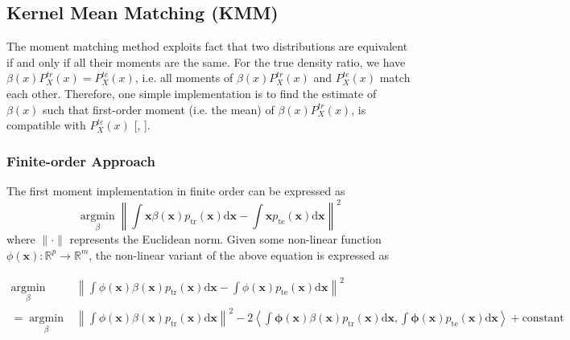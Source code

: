 \documentclass[a4paper,12pt]{article}
\begin{document}
%
%
%
%
%
%
\subsection{Kernel Mean Matching (KMM)}
The moment matching method exploits fact that two distributions are equivalent if and only if all their moments are the same. For the true density ratio, we have $\beta(x){P^{tr}_{X}(x)} =  P^{te}_{X}(x)$, i.e. all moments of $\beta(x){P^{tr}_{X}(x)}$ and $P^{te}_{X}(x)$ match each other. Therefore, one simple implementation is to find the estimate of $\beta(x)$ such that first-order moment (i.e. the mean) of $\beta(x)P^{tr}_{X}(x)$, is compatible with $P^{te}_{X}(x)$ [\cite{gretton2009covariate}, \cite{sugiyama2010density}].

\subsubsection{Finite-order Approach}
The first moment implementation in finite order can be expressed as 
\begin{equation*}
\underset{\beta}{\operatorname{argmin}}\left\|\int \boldsymbol{x} \beta(\boldsymbol{x}) p_{\mathrm{tr}}(\boldsymbol{x}) \mathrm{d} \boldsymbol{x}-\int \boldsymbol{x} p_{\mathrm{te}}(\boldsymbol{x}) \mathrm{d} \boldsymbol{x}\right\|^{2}
\end{equation*}
where $\|\cdot\|$ represents the Euclidean norm. Given some non-linear function $\phi(\boldsymbol{x}): \mathbb{R}^{p} \rightarrow \mathbb{R}^{m}$, the non-linear variant of the above equation is expressed as 

\begin{align*}
\underset{\beta}{\operatorname{argmin}} & \left\|\int \phi{(\boldsymbol{x})} \beta(\boldsymbol{x}) p_{\mathrm{tr}}(\boldsymbol{x}) \mathrm{d} \boldsymbol{x}-\int \phi{(\boldsymbol{x})} p_{\mathrm{te}}(\boldsymbol{x}) \mathrm{d} \boldsymbol{x}\right\|^{2} \\
= \underset{\beta}{\operatorname{argmin}} & \left\|\int \phi(\boldsymbol{x}) \beta(\boldsymbol{x}) p_{\mathrm{tr}}(\boldsymbol{x}) \mathrm{d} \boldsymbol{x}\right\|^{2}-2\left\langle\int \boldsymbol{\phi}(\boldsymbol{x}) \beta(\boldsymbol{x}) p_{\mathrm{tr}}(\boldsymbol{x}) \mathrm{d} \boldsymbol{x}, \int \boldsymbol{\phi}(\boldsymbol{x}) p_{\mathrm{te}}(\boldsymbol{x}) \mathrm{d} \boldsymbol{x}\right\rangle + \text{constant}
\end{align*}
\end{document}
